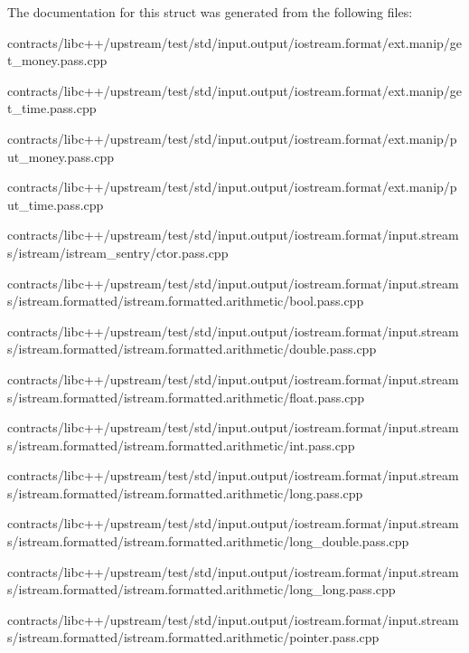 The documentation for this struct was generated from the following files\+:\begin{DoxyCompactItemize}
\item 
contracts/libc++/upstream/test/std/input.\+output/iostream.\+format/ext.\+manip/get\+\_\+money.\+pass.\+cpp\item 
contracts/libc++/upstream/test/std/input.\+output/iostream.\+format/ext.\+manip/get\+\_\+time.\+pass.\+cpp\item 
contracts/libc++/upstream/test/std/input.\+output/iostream.\+format/ext.\+manip/put\+\_\+money.\+pass.\+cpp\item 
contracts/libc++/upstream/test/std/input.\+output/iostream.\+format/ext.\+manip/put\+\_\+time.\+pass.\+cpp\item 
contracts/libc++/upstream/test/std/input.\+output/iostream.\+format/input.\+streams/istream/istream\+\_\+sentry/ctor.\+pass.\+cpp\item 
contracts/libc++/upstream/test/std/input.\+output/iostream.\+format/input.\+streams/istream.\+formatted/istream.\+formatted.\+arithmetic/bool.\+pass.\+cpp\item 
contracts/libc++/upstream/test/std/input.\+output/iostream.\+format/input.\+streams/istream.\+formatted/istream.\+formatted.\+arithmetic/double.\+pass.\+cpp\item 
contracts/libc++/upstream/test/std/input.\+output/iostream.\+format/input.\+streams/istream.\+formatted/istream.\+formatted.\+arithmetic/float.\+pass.\+cpp\item 
contracts/libc++/upstream/test/std/input.\+output/iostream.\+format/input.\+streams/istream.\+formatted/istream.\+formatted.\+arithmetic/int.\+pass.\+cpp\item 
contracts/libc++/upstream/test/std/input.\+output/iostream.\+format/input.\+streams/istream.\+formatted/istream.\+formatted.\+arithmetic/long.\+pass.\+cpp\item 
contracts/libc++/upstream/test/std/input.\+output/iostream.\+format/input.\+streams/istream.\+formatted/istream.\+formatted.\+arithmetic/long\+\_\+double.\+pass.\+cpp\item 
contracts/libc++/upstream/test/std/input.\+output/iostream.\+format/input.\+streams/istream.\+formatted/istream.\+formatted.\+arithmetic/long\+\_\+long.\+pass.\+cpp\item 
contracts/libc++/upstream/test/std/input.\+output/iostream.\+format/input.\+streams/istream.\+formatted/istream.\+formatted.\+arithmetic/pointer.\+pass.\+cpp\item 

\end{DoxyCompactItemize}
